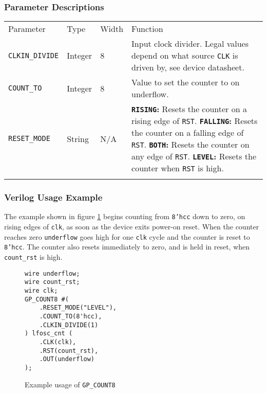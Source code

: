 \documentclass[11pt]{article}
\newcommand{\tokenstyle}[1]{\texttt{#1}}
\newcommand{\wirestyle}[1]{\texttt{#1}}
\newcommand{\valuestyle}[1]{\texttt{#1}}
\newcommand{\strvaluestyle}[1]{\valuestyle{\textquotedbl#1\textquotedbl}}
\newcommand{\strexamplestyle}[1]{\textbf{\strvaluestyle{#1}:}}
\newcommand{\datastyle}[1]{\texttt{#1}}
\newcommand{\whenstyle}[1]{{\fontseries{sb}\selectfont#1}}
\newcommand{\thinhline}{\Xhline{1\arrayrulewidth}}
\newcommand{\thickhline}{\Xhline{2.5\arrayrulewidth}}
\begin{document}
\subsubsection{Parameter Descriptions}

\begin{tabularx}{\textwidth}{lllX}
\thinhline
\whenstyle{Parameter} & \whenstyle{Type} & \whenstyle{Width} & \whenstyle{Function} \\
\thickhline
\tokenstyle{CLKIN\_DIVIDE} & Integer & 8 &
	Input clock divider. Legal values depend on what source \tokenstyle{CLK} is driven by, see device datasheet.\\
\thinhline
\tokenstyle{COUNT\_TO} & Integer & 8 & Value to set the counter to on underflow. \\
\thinhline
\tokenstyle{RESET\_MODE} & String & N/A &
	\strexamplestyle{RISING} Resets the counter on a rising edge of \tokenstyle{RST}. \newline
	\strexamplestyle{FALLING} Resets the counter on a falling edge of \tokenstyle{RST}. \newline
	\strexamplestyle{BOTH} Resets the counter on any edge of \tokenstyle{RST}. \newline
	\strexamplestyle{LEVEL} Resets the counter when \tokenstyle{RST} is high. \\
\thinhline
\end{tabularx}

\subsubsection{Verilog Usage Example}

The example shown in figure \ref{gp-count8-example} begins counting from \datastyle{8'hcc} down to zero,
on rising edges of \wirestyle{clk}, as soon as the device exits power-on reset. When the counter reaches zero
\wirestyle{underflow} goes high for one \wirestyle{clk} cycle and the counter is reset to \datastyle{8'hcc}.
The counter also resets immediately to zero, and is held in reset, when \wirestyle{count\_rst} is high.

\begin{figure}[h]
\begin{lstlisting}
wire underflow;
wire count_rst;
wire clk;
GP_COUNT8 #(
	.RESET_MODE("LEVEL"),
	.COUNT_TO(8'hcc),
	.CLKIN_DIVIDE(1)
) lfosc_cnt (
	.CLK(clk),
	.RST(count_rst),
	.OUT(underflow)
);
\end{lstlisting}
\caption{Example usage of \tokenstyle{GP\_COUNT8}}
\label{gp-count8-example}
\end{figure}
\end{document}
